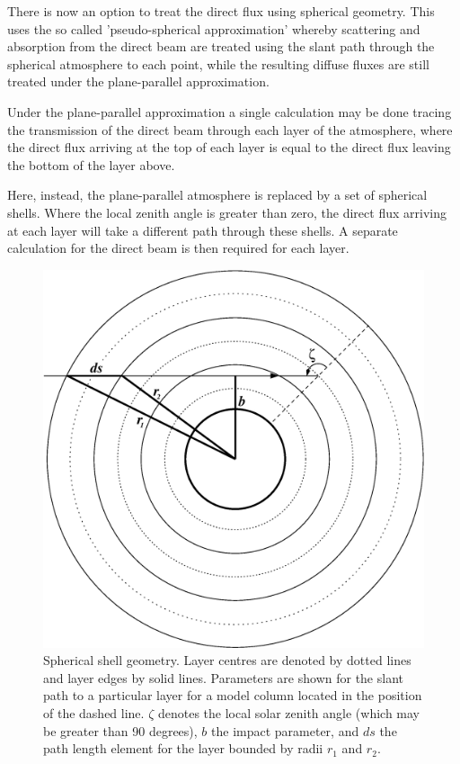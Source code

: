There is now an option to treat the direct flux using spherical geometry.
This uses the so called 'pseudo-spherical approximation' whereby scattering
and absorption from the direct beam are treated using the slant path through
the spherical atmosphere to each point, while the resulting diffuse fluxes
are still treated under the plane-parallel approximation.

\noindent
Under the plane-parallel approximation a single calculation may be done
tracing the transmission of the direct beam through each layer of the
atmosphere, where the direct flux arriving at the top of each layer is 
equal to the direct flux leaving the bottom of the layer above.

\noindent
Here, instead, the plane-parallel atmosphere is replaced by a set of spherical
shells. Where the local zenith angle is greater than zero, the direct flux
arriving at each layer will take a different path through these shells. A
separate calculation for the direct beam is then required for each layer.

\begin{figure}[t]
\centering
\includegraphics[scale=0.5]{sph_geom.eps}
\caption{Spherical shell geometry. Layer centres are denoted by dotted lines
and layer edges by solid lines. Parameters are shown for the slant path
to a particular layer for a model column located in the position of the dashed
line. $\zeta$ denotes the local solar zenith angle (which may be greater than
90 degrees), $b$ the impact parameter, and $ds$ the path length element for
the layer bounded by radii $r_1$ and $r_2$.}
\label{fig:sph_geom}
\end{figure}

